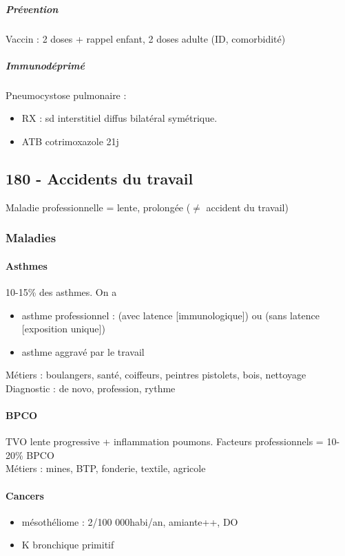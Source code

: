 \documentclass[11pt]{article}
\begin{document}
\subparagraph{Prévention}
\label{sec:orgd228454}
Vaccin : 2 doses + rappel enfant, 2 doses adulte (ID, comorbidité)

\subparagraph{Immunodéprimé}
\label{sec:orgb76bbbf}
Pneumocystose pulmonaire : 

\begin{itemize}
\item RX : sd interstitiel diffus bilatéral symétrique.
\item ATB cotrimoxazole 21j
\end{itemize}

\subsection{180 \textdagger{} - Accidents du travail}
\label{sec:orgfc944dc}
Maladie professionnelle = lente, prolongée (\(\neq\) accident du travail)
\subsubsection{Maladies}
\label{sec:orge4d8ac7}
\paragraph{Asthmes}
\label{sec:orgedf2324}
10-15\% des asthmes. On a

\begin{itemize}
\item asthme professionnel : (avec latence [immunologique]) ou (sans latence
[exposition unique])
\item asthme aggravé par le travail
\end{itemize}

Métiers : boulangers, santé, coiffeurs, peintres pistolets, bois, nettoyage\\
Diagnostic : de novo, profession, rythme
\paragraph{BPCO}
\label{sec:org36b9bff}
\gls{TVO} lente progressive + inflammation
poumons. Facteurs professionnels = 10-20\% BPCO\\
Métiers : mines, BTP, fonderie, textile, agricole
\paragraph{Cancers}
\label{sec:org86681ec}

\begin{itemize}
\item mésothéliome : 2/100 000habi/an, amiante++, DO
\item K bronchique primitif
\end{itemize}
\end{document}
